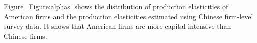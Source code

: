 \documentclass[12pt]{article}
\begin{document}
%
%

%
%
%
Figure~\ref{Figure:alphas} shows the distribution of production elasticities of American firms and the production elasticities estimated using Chinese firm-level survey data.  It shows that American firms are more capital intensive than Chinese firms.
\end{document}
